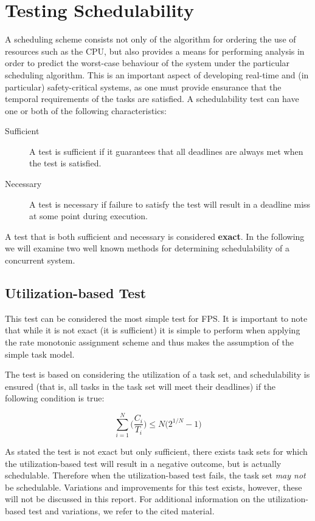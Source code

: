 \section{Testing Schedulability} %
\label{sec:schedulability_analysis}
A scheduling scheme consists not only of the algorithm for ordering the use of resources such as the CPU, but also provides a means for performing analysis in order to predict the worst-case behaviour of the system under the particular scheduling algorithm. This is an important aspect of developing real-time and (in particular) safety-critical systems, as one must provide ensurance that the temporal requirements of the tasks are satisfied. A schedulability test can have one or both of the following characteristics:
\begin{description}
	\item[Sufficient] A test is sufficient if it guarantees that all deadlines are always met when the test is satisfied.
	\item[Necessary] A test is necessary if failure to satisfy the test will result in a deadline miss at some point during execution.
\end{description}
A test that is both sufficient and necessary is considered \textbf{exact}. In the following we will examine two well known methods for determining schedulability of a concurrent system.

\subsection{Utilization-based Test} %
\label{sub:utilization_based_test}
This test can be considered the most simple test for FPS. It is important to note that while it is not exact (it is sufficient) it is simple to perform when applying the rate monotonic assignment scheme and thus makes the assumption of the simple task model.

The test is based on considering the utilization of a task set, and schedulability is ensured (that is, all tasks in the task set will meet their deadlines) if the following condition is true:

\begin{equation}
	\sum_{i=1}^N \biggl(\frac{C_i}{T_i}\biggr) \le N\bigl( 2^{1/N} - 1 \bigr)
\end{equation}

As stated the test is not exact but only sufficient, there exists task sets for which the utilization-based test will result in a negative outcome, but is actually schedulable. Therefore when the utilization-based test fails, the task set \textit{may not} be schedulable. Variations and improvements for this test exists, however, these will not be discussed in this report. For additional information on the utilization-based test and variations, we refer to the cited material.

